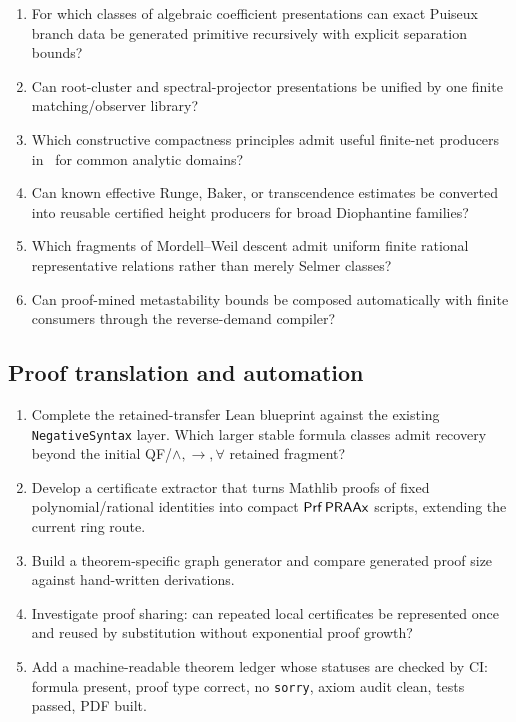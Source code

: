 \begin{enumerate}[label=\textbf{R\arabic*.},resume]
  \item For which classes of algebraic coefficient presentations can exact Puiseux branch data be generated primitive recursively with explicit separation bounds?
  \item Can root-cluster and spectral-projector presentations be unified by one finite matching/observer library?
  \item Which constructive compactness principles admit useful finite-net producers in \iPRA\ for common analytic domains?
  \item Can known effective Runge, Baker, or transcendence estimates be converted into reusable certified height producers for broad Diophantine families?
  \item Which fragments of Mordell--Weil descent admit uniform finite rational representative relations rather than merely Selmer classes?
  \item Can proof-mined metastability bounds be composed automatically with finite consumers through the reverse-demand compiler?
\end{enumerate}

\subsection{Proof translation and automation}

\begin{enumerate}[label=\textbf{R\arabic*.},resume]
  \item Complete the retained-transfer Lean blueprint against the existing \texttt{NegativeSyntax} layer.  Which larger stable formula classes admit recovery beyond the initial QF/\(\wedge,\to,\forall\) retained fragment?
  \item Develop a certificate extractor that turns Mathlib proofs of fixed polynomial/rational identities into compact \(\mathsf{Prf}\,\mathsf{PRAAx}\) scripts, extending the current ring route.
  \item Build a theorem-specific graph generator and compare generated proof size against hand-written derivations.
  \item Investigate proof sharing: can repeated local certificates be represented once and reused by substitution without exponential proof growth?
  \item Add a machine-readable theorem ledger whose statuses are checked by CI: formula present, proof type correct, no \texttt{sorry}, axiom audit clean, tests passed, PDF built.
\end{enumerate}

